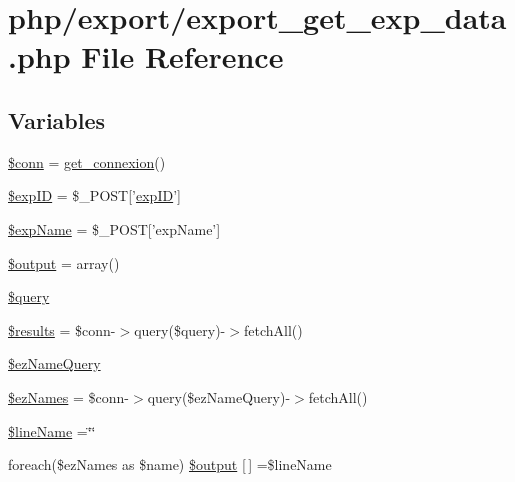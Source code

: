 \hypertarget{export__get__exp__data_8php}{\section{php/export/export\-\_\-get\-\_\-exp\-\_\-data.php File Reference}
\label{export__get__exp__data_8php}
}
\subsection*{Variables}
\begin{DoxyCompactItemize}
\item 
\hyperlink{export__get__exp__data_8php_aa8a5a87b9c1a6a0819b88447cbe41877}{\$conn} = \hyperlink{php__functions_8php_ace18bc10f3fd08f92688ac743e0d8c2e}{get\-\_\-connexion}()
\item 
\hyperlink{export__get__exp__data_8php_ae384d32e62e85e587cd27bf249ed3db3}{\$exp\-I\-D} = \$\-\_\-\-P\-O\-S\-T\mbox{[}'\hyperlink{admin_rawdata_8php_a888d53a6517f4272b5982c3ca9d16e8a}{exp\-I\-D}'\mbox{]}
\item 
\hyperlink{export__get__exp__data_8php_a6478e66386fefd0e5fd6de22d695ffca}{\$exp\-Name} = \$\-\_\-\-P\-O\-S\-T\mbox{[}'exp\-Name'\mbox{]}
\item 
\hyperlink{export__get__exp__data_8php_a73004ce9cd673c1bfafd1dc351134797}{\$output} = array()
\item 
\hyperlink{export__get__exp__data_8php_af59a5f7cd609e592c41dc3643efd3c98}{\$query}
\item 
\hyperlink{export__get__exp__data_8php_a233d12bd8b6d3453e9a7a3f0b8c31db2}{\$results} = \$conn-\/$>$query(\$query)-\/$>$fetch\-All()
\item 
\hyperlink{export__get__exp__data_8php_a2d58bfaabf81051b4d9e9cb2d8ed5941}{\$ez\-Name\-Query}
\item 
\hyperlink{export__get__exp__data_8php_a3af2456d6a8126f749b1cfca0ba77027}{\$ez\-Names} = \$conn-\/$>$query(\$ez\-Name\-Query)-\/$>$fetch\-All()
\item 
\hyperlink{export__get__exp__data_8php_ac098f986b0121aa5592943a8ea80e37b}{\$line\-Name} =\char`\"{}\char`\"{}
\item 
foreach(\$ez\-Names as \$name) \hyperlink{export__get__exp__data_8php_a1b7e843aa496f34e3c661d1eefbf7b84}{\$output} \mbox{[}$\,$\mbox{]} =\$line\-Name
\end{DoxyCompactItemize}


